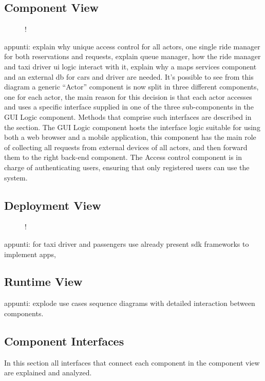 \subsection{Component View}
\label{sec:component-view}
\begin{figure}[H]
	\centering
	\resizebox{6in}
	{!}{}
\end{figure}
appunti: explain why unique access control for all actors, one single ride manager for both reservations and requests, explain queue manager, how the ride manager and taxi driver ui logic interact with it, explain why a maps services component and an external db for cars and driver are needed. \newline
It's possible to see from this diagram a generic ``Actor'' component is now split in three different components, one for each actor, the main reason for this decision is that each actor accesses and uses a specific interface supplied in one of the three sub-components in the GUI Logic component. Methods that comprise such interfaces are described in the  section. \newline
The GUI Logic component hosts the interface logic suitable for using both a web browser and a mobile application, this component has the main role of collecting all requests from external devices of all actors, and then forward them to the right back-end component. \newline
The Access control component is in charge of authenticating users, ensuring that only registered users can use the system.
\subsection{Deployment View}
\begin{figure}[H]
	\centering
	\resizebox{6in}
	{!}{}
\end{figure}
appunti: for taxi driver and passengers use already present sdk frameworks to implement apps,
\subsection{Runtime View}
appunti: explode use cases sequence diagrams with detailed interaction between components.
\subsection{Component Interfaces}
In this section all interfaces that connect each component in the component view are explained and analyzed.
